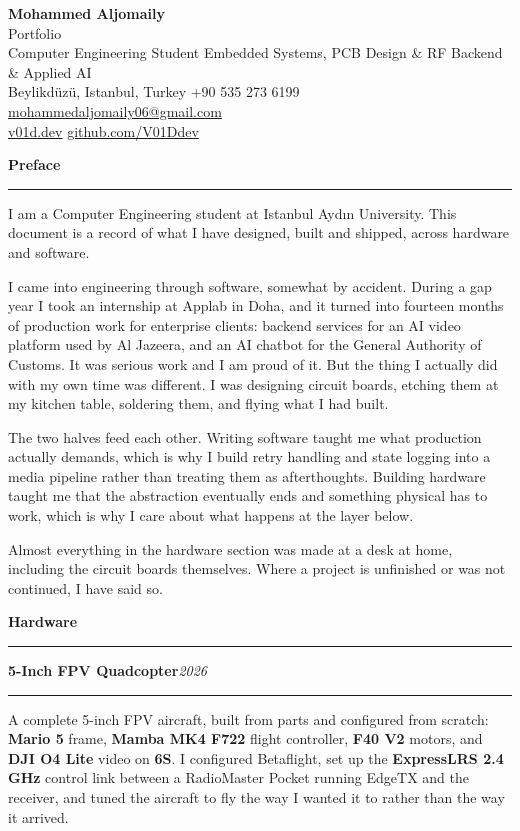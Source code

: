 \documentclass[11pt,a4paper]{article}
\newcommand{\entry}[2]{%
  \vspace{6pt}%
  {\Large\bfseries #1}\hfill{\itshape\small #2}\par
  \vspace{3pt}\hrule\vspace{4pt}%
}
\newcommand{\domain}[1]{%
  \vspace{16pt}%
  {\LARGE\bfseries #1}\par
  \vspace{3pt}\hrule\vspace{8pt}%
}
\begin{document}
\begin{center}
    {\LARGE \textbf{Mohammed Aljomaily}}\\[3pt]
    {\large Portfolio}\\[6pt]
    {\small Computer Engineering Student \textbar{} Embedded Systems, PCB Design \& RF \textbar{} Backend \& Applied AI}\\[3pt]
    {\small Beylikd\"uz\"u, Istanbul, Turkey \textbar{} +90 535 273 6199 \textbar{}
    \href{mailto:mohammedaljomaily06@gmail.com}{mohammedaljomaily06@gmail.com}}\\[2pt]
    {\small \href{https://v01d.dev}{v01d.dev} \textbar{} \href{https://github.com/V01Ddev}{github.com/V01Ddev}}
\end{center}

\entry{Preface}{}

I am a Computer Engineering student at Istanbul Ayd{\i}n University. This
document is a record of what I have designed, built and shipped, across hardware
and software.

I came into engineering through software, somewhat by accident. During a gap
year I took an internship at Applab in Doha, and it turned into fourteen months
of production work for enterprise clients: backend services for an AI video
platform used by Al Jazeera, and an AI chatbot for the General Authority of
Customs. It was serious work and I am proud of it. But the thing I actually did
with my own time was different. I was designing circuit boards, etching them at
my kitchen table, soldering them, and flying what I had built.

The two halves feed each other. Writing software taught me what production
actually demands, which is why I build retry handling and state logging into a
media pipeline rather than treating them as afterthoughts. Building hardware
taught me that the abstraction eventually ends and something physical has to
work, which is why I care about what happens at the layer below.

Almost everything in the hardware section was made at a desk at home, including
the circuit boards themselves. Where a project is unfinished or was not
continued, I have said so.

\domain{Hardware}

\entry{5-Inch FPV Quadcopter}{2026}

A complete 5-inch FPV aircraft, built from parts and configured from scratch:
\textbf{Mario 5} frame, \textbf{Mamba MK4 F722} flight controller, \textbf{F40 V2}
motors, and \textbf{DJI O4 Lite} video on \textbf{6S}. I configured Betaflight,
set up the \textbf{ExpressLRS 2.4\,GHz} control link between a RadioMaster Pocket
running EdgeTX and the receiver, and tuned the aircraft to fly the way I wanted
it to rather than the way it arrived.
\end{document}
